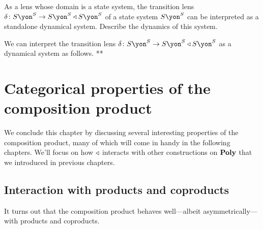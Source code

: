 \documentclass[Book-Poly]{subfiles}
\begin{document}
\begin{exercise}
As a lens whose domain is a state system, the transition lens $\delta\colon S\yon^S\to S\yon^S\tri S\yon^S$ of a state system $S\yon^S$ can be interpreted as a standalone dynamical system. Describe the dynamics of this system.
\begin{solution}
We can interpret the transition lens $\delta\colon S\yon^S\to S\yon^S\tri S\yon^S$ as a dynamical system as follows.
**
\end{solution}
\end{exercise}

\section{Categorical properties of the composition product} \label{sec.comon.comp.prop}

We conclude this chapter by discussing several interesting properties of the composition product, many of which will come in handy in the following chapters.
We'll focus on how $\mathbin{\triangleleft}$ interacts with other constructions on $\mathbf{Poly}$ that we introduced in previous chapters.

\subsection{Interaction with products and coproducts} \label{subsec.comon.comp.prop.prod}

It turns out that the composition product behaves well---albeit asymmetrically---with products and coproducts.
\end{document}
